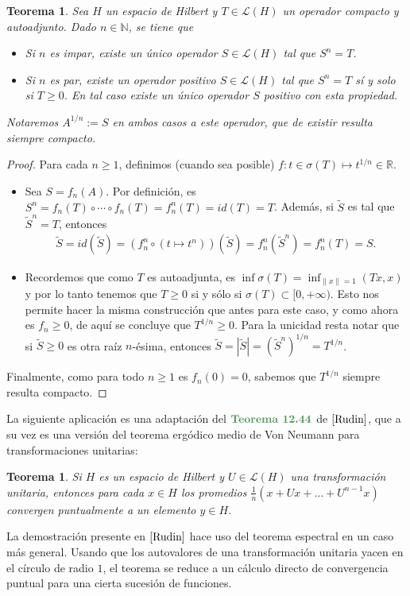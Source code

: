 \documentclass[11pt]{report}
\theoremstyle{colored}
\newtheorem{theorem}{Teorema}[section]
\newtheorem*{theorem*}{Teorema}
\newcommand{\N}{\mathbb{N}}
\newcommand{\R}{\mathbb{R}}
\newcommand{\paint}[1]{\color{color}{#1}}
\newcommand{\tpaint}[1]{\paint{\textbf{#1}}}
\begin{document}
\begin{theorem}  Sea $H$ un espacio de Hilbert y $T \in \mathscr{L}(H)$ un operador compacto y autoadjunto. Dado $n \in \N$, se tiene que 
\begin{itemize}
\item[(i)] Si $n$ es impar, existe un único operador $S \in \mathscr{L}(H)$ tal que $S^n = T$.
\item[(ii)] Si $n$ es par, existe un operador positivo $S \in \mathscr{L}(H)$ tal que $S^n = T$ sí y solo si $T \geq 0$. En tal caso existe un único operador $S$ positivo con esta propiedad.
\end{itemize}
Notaremos $A^{1/n} := S$ en ambos casos a este operador, que de existir resulta siempre compacto.
\end{theorem}
\begin{proof} Para cada $n \geq 1$, definimos (cuando sea posible) $f :t \in \sigma(T) \mapsto t^{1/n} \in \R$.
\begin{itemize}[listparindent = \parindent] 
\item[(i)] Sea $S = f_n(A)$. Por definición, es $S^n = f_n(T) \circ \cdots \circ f_n(T) = f_n^n(T) = id(T) = T$. Además, si $\widetilde{S}$ es tal que $\widetilde{S}^n = T$, entonces
\begin{align*}
\widetilde{S} = id(\widetilde{S}) = (f_n^n \circ (t \mapsto t^n))(\widetilde{S}) = f_n^n(\widetilde{S}^n) = f_n^n(T) = S.
\end{align*}
\item[(ii)] Recordemos que como $T$ es autoadjunta, es $\inf \sigma(T) = \inf_{\|x\| = 1} (Tx,x)$ y por lo tanto tenemos que $T \geq 0$ si y sólo si $\sigma(T) \subset [0,+\infty)$. 
Esto nos permite hacer la misma construcción que antes para este caso, y como ahora es $f_n \geq 0$, de aquí se concluye que $T^{1/n} \geq 0$. Para la unicidad resta notar que si $\widetilde{S} \geq 0$ es otra raíz $n$-ésima, entonces $\widetilde{S} = |\widetilde{S}| = (\widetilde{S}^n)^{1/n} = T^{1/n}$.
\end{itemize}

Finalmente, como para todo $n \geq 1$ es $f_n(0) = 0$, sabemos que $T^{1/n}$ siempre resulta compacto.
\end{proof}

La siguiente aplicación es una adaptación del $\tpaint{Teorema 12.44}$ de $\cite{Rudin}$, que a su vez es una versión del teorema ergódico medio de Von Neumann para transformaciones unitarias:

\begin{tcolorbox}
\begin{theorem*} Si $H$ es un espacio de Hilbert y $U \in \mathscr{L}(H)$ una transformación unitaria, entonces para cada $x \in H$ los \textit{promedios} $\frac{1}{n}(x + Ux + \dots + U^{n-1}x)$ convergen puntualmente a un elemento $y \in H$.
\end{theorem*}
\end{tcolorbox}
La demostración presente en $\cite{Rudin}$ hace uso del teorema espectral en un caso más general. Usando que los autovalores de una transformación unitaria yacen en el círculo de radio $1$, el teorema se reduce a un cálculo directo de convergencia puntual para una cierta sucesión de funciones.
\end{document}
